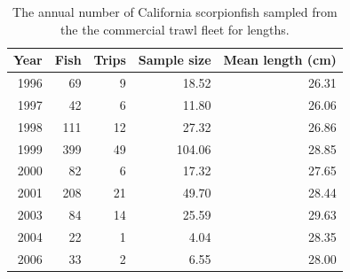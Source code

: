 \documentclass[12pt,]{article}
\begin{document}
\begin{table}[ht]
\begin{tabular}{rrrrr}
   \hline
\end{tabular}
\end{table}\begin{table}[ht]
\centering
\caption{The annual number of California scorpionfish 
                                              sampled from the the commercial trawl 
                                            fleet for lengths.} 
\label{tab:ComTrawl_lengthsample}
\begin{tabular}{rrrrr}
  \hline
Year & Fish & Trips & Sample size & Mean length (cm) \\ 
  \hline
1996 &  69 &   9 & 18.52 & 26.31 \\ 
  1997 &  42 &   6 & 11.80 & 26.06 \\ 
  1998 & 111 &  12 & 27.32 & 26.86 \\ 
  1999 & 399 &  49 & 104.06 & 28.85 \\ 
  2000 &  82 &   6 & 17.32 & 27.65 \\ 
  2001 & 208 &  21 & 49.70 & 28.44 \\ 
  2003 &  84 &  14 & 25.59 & 29.63 \\ 
  2004 &  22 &   1 & 4.04 & 28.35 \\ 
  2006 &  33 &   2 & 6.55 & 28.00 \\ 
   \hline
\end{tabular}
\end{table}

\FloatBarrier
\newpage
\end{document}
